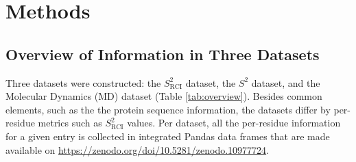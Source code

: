 \section{Methods}

\subsection{Overview of Information in Three Datasets}
\label{sec:methods-overview}

Three datasets were constructed: the $S^{2}_{\text{RCI}}$ dataset, the $S^{2}$ dataset, and the Molecular Dynamics (MD) dataset (Table \ref{tab:overview}). Besides common elements, such as the the protein sequence information, the datasets differ by per-residue metrics such as $S^2_{\text{RCI}}$ values. Per dataset, all the per-residue information for a given entry is collected in integrated Pandas data frames \cite{mckinney-proc-scipy-2010, reback2020pandas} that are made available on \url{https://zenodo.org/doi/10.5281/zenodo.10977724}.


